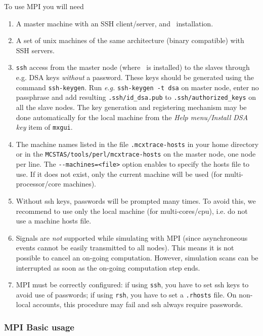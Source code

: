 To use MPI you will need
  \begin{enumerate}
  \item{A master machine with an SSH client/server, and \MCX\ installation.}
  \item{A set of unix machines of the same architecture (binary compatible) with SSH servers.}
  \item{ \texttt{ssh} access from the master node (where \MCX\ is
      installed) to the slaves through e.g. DSA keys \emph{without} a
      password. These keys should be generated using the command
      \texttt{ssh-keygen}. Run \emph{e.g.} \texttt{ssh-keygen -t dsa} on
      master node, enter no passphrase and add resulting
      \texttt{.ssh/id\_dsa.pub} to \texttt{.ssh/authorized\_keys}
      on all the slave nodes. The key generation and registering mechanism 
      may be done automatically for the local machine from the 
      \emph{Help menu/Install DSA key} item of \verb+mxgui+.}
  \item{The machine names listed in the file \texttt{.mcxtrace-hosts} in
      your home directory or in the \texttt{MCSTAS/tools/perl/mcxtrace-hosts} on
      the master node, one node per line. The \verb'--machines=<file>' option
      enables to specify the hosts file to use. If it does not exist, only 
      the current machine will be used (for multi-processor/core machines).}
  \item{Without ssh keys, passwords will be prompted many times. To avoid this, 
      we recommend to use only the local machine (for multi-cores/cpu), i.e. do
      not use a machine hosts file.}
  \item Signals are \emph{not} supported while simulating with MPI (since
    asynchroneous events cannot be easily transmitted to all nodes). This
    means it is not possible to cancel an on-going computation. However, 
    simulation scans can be interrupted as soon as the on-going computation 
    step ends.
  \item MPI must be correctly configured: if using \verb'ssh', you
    have to set ssh keys to avoid use of passwords; if
    using \verb'rsh', you have to set a \verb'.rhosts' file.
    On non-local accounts, this procedure may fail and ssh always require passwords.
  \end{enumerate}

\subsubsection{MPI Basic usage}

